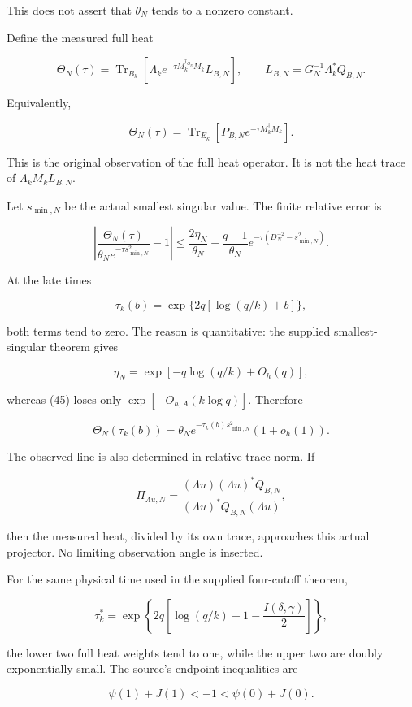 \documentclass[11pt]{article}
\begin{document}
This does not assert that \(\theta_N\) tends to a nonzero constant.

Define the measured full heat

\[
\Theta_N(\tau)
=
\operatorname{Tr}_{B_k}
\left[
\Lambda_k e^{-\tau M_k^{\dagger_{G_N}}M_k}
L_{B,N}
\right],
\qquad
L_{B,N}=G_N^{-1}\Lambda_k^*Q_{B,N}.
\tag{47}
\]

Equivalently,

\[
\Theta_N(\tau)
=
\operatorname{Tr}_{E_k}
\left[P_{B,N}e^{-\tau M_k^\dagger M_k}\right].
\]

This is the original observation of the full heat operator. It is not the heat trace of \(\Lambda_kM_kL_{B,N}\).

Let \(s_{\min,N}\) be the actual smallest singular value. The finite relative error is

\[
\boxed{
\left|
\frac{\Theta_N(\tau)}
{\theta_N e^{-\tau s_{\min,N}^2}}-1
\right|
\le
\frac{2\eta_N}{\theta_N}
+
\frac{q-1}{\theta_N}
e^{-\tau(D_N^{-2}-s_{\min,N}^2)}.
}
\tag{48}
\]

At the late times

\[
\tau_k(b)=\exp\{2q[\log(q/k)+b]\},
\]

both terms tend to zero. The reason is quantitative: the supplied smallest-singular theorem gives

\[
\eta_N=\exp[-q\log(q/k)+O_h(q)],
\]

whereas (45) loses only \(\exp[-O_{h,A}(k\log q)]\). Therefore

\[
\boxed{
\Theta_N(\tau_k(b))
=
\theta_N e^{-\tau_k(b)s_{\min,N}^2}(1+o_h(1)).
}
\tag{49}
\]

The observed line is also determined in relative trace norm. If

\[
\Pi_{\Lambda u,N}
=
\frac{(\Lambda u)(\Lambda u)^*Q_{B,N}}
{(\Lambda u)^*Q_{B,N}(\Lambda u)},
\]

then the measured heat, divided by its own trace, approaches this actual projector. No limiting observation angle is inserted.

For the same physical time used in the supplied four-cutoff theorem,

\[
\boxed{
\tau_k^*
=
\exp\left\{
2q\left[
\log(q/k)-1-\frac{I(\delta,\gamma)}2
\right]
\right\},
}
\tag{50}
\]

the lower two full heat weights tend to one, while the upper two are doubly exponentially small. The source's endpoint inequalities are

\[
\psi(1)+J(1)<-1<\psi(0)+J(0).
\]
\end{document}
